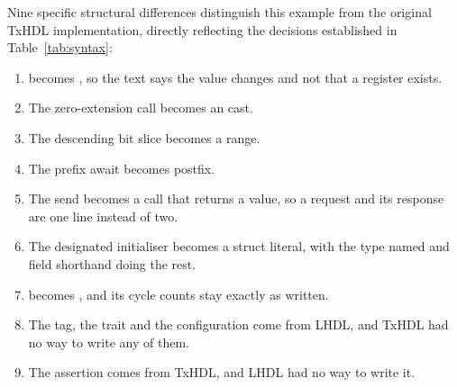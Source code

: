 Nine specific structural differences distinguish this example from the
original TxHDL implementation, directly reflecting the decisions established
in Table~\ref{tab:syntax}:

\begin{enumerate}
  \item {} becomes , so the text says the
        value changes and not that a register exists.
  \item The zero-extension call becomes an  cast.
  \item The descending bit slice becomes a range.
  \item The prefix await becomes postfix.
  \item The send becomes a call that returns a value, so a request and its
        response are one line instead of two.
  \item The designated initialiser becomes a struct literal, with the type
        named and field shorthand doing the rest.
  \item {} becomes , and its cycle counts stay
        exactly as written.
  \item The tag, the trait and the configuration come from LHDL, and TxHDL
        had no way to write any of them.
  \item The assertion comes from TxHDL, and LHDL had no way to write it.
\end{enumerate}
